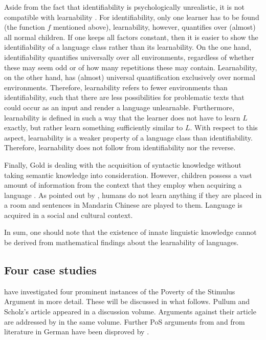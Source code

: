 Aside from the fact that identifiability is psychologically unrealistic, it is not compatible with learnability \citep[]{Johnson2004a}.
For identifiability, only one learner has to be found (the function $f$ mentioned above), learnability, however, quantifies over
(almost) all normal children. If one keeps all factors constant, then it is easier to show the identifiability of a language class rather than
its learnability.
On the one hand, identifiability quantifies universally over all environments, regardless of whether these may seem odd or of how many repetitions these may contain.
Learnability, on the other hand, has (almost) universal quantification exclusively over normal environments. Therefore, learnability refers to fewer environments
than identifiability, such that there are less possibilities for problematic texts that could occur as an input and render a language unlearnable.
Furthermore, learnability is defined in such a way that the learner does not have to learn $L$ exactly, but rather learn something sufficiently similar
to $L$. With respect to this aspect, learnability is a weaker property of a language class than
identifiability. Therefore, learnability does not follow from identifiability nor the reverse.
  
Finally, Gold is dealing with the acquisition of syntactic knowledge without taking semantic knowledge into consideration.  
However, children possess a vast amount of information from the context that they employ when acquiring a language \citep{TCCBM2005a}.
As pointed out by \citet[]{Klein86a-u}, humans do not learn anything if they are placed in a room and sentences in
Mandarin Chinese are played to them. Language is acquired in a social and cultural context.
  
In sum, one should note that the existence of innate linguistic knowledge cannot be derived from mathematical
findings about the learnability of languages.  

\subsection{Four case studies}
\label{PSA-Faelle}

\mbox{}\citet{PS2002a} have investigated four prominent instances of the Poverty of the Stimulus Argument in more detail.
These will be discussed in what follows. Pullum and Scholz's article appeared in a discussion volume. Arguments against their
article are addressed by \citet{SP2002b} in the same volume. Further PoS arguments from \citet{Chomsky86} and
from literature in German have been disproved by \citet{Eisenberg92b}.

